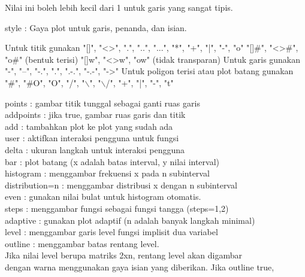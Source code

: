 \documentclass[a4paper,10pt]{article}
\begin{document}
\begin{eulernotebook}
\begin{eulercomment}
\begin{eulercomment}
\begin{eulercomment}
\begin{eulercomment}
\begin{eulercomment}
\begin{eulercomment}
\begin{eulercomment}
\end{eulercomment}
\begin{eulerttcomment}
            Nilai ini boleh lebih kecil dari 1 untuk garis yang sangat tipis.
\end{eulerttcomment}
\begin{eulercomment}
style     : Gaya plot untuk garis, penanda, dan isian.\\
\end{eulercomment}
\begin{eulerttcomment}
            Untuk titik gunakan
            "[]", "<>", ".", "..", "...",
            "*", "+", "|", "-", "o"
            "[]#", "<>#", "o#" (bentuk terisi)
            "[]w", "<>w", "ow" (tidak transparan)
            Untuk garis gunakan
            "-", "--", "-.", ".", ".-.", "-.-", "->"
            Untuk poligon terisi atau plot batang gunakan
            "#", "#O", "O", "/", "\(\backslash\)", "\(\backslash\)/",
            "+", "|", "-", "t"
\end{eulerttcomment}
\begin{eulercomment}
points    : gambar titik tunggal sebagai ganti ruas garis\\
addpoints : jika true, gambar ruas garis dan titik\\
add       : tambahkan plot ke plot yang sudah ada\\
user      : aktifkan interaksi pengguna untuk fungsi\\
delta     : ukuran langkah untuk interaksi pengguna\\
bar       : plot batang (x adalah batas interval, y nilai interval)\\
histogram : menggambar frekuensi x pada n subinterval\\
distribution=n : menggambar distribusi x dengan n subinterval\\
even      : gunakan nilai bulat untuk histogram otomatis.\\
steps     : menggambar fungsi sebagai fungsi tangga (steps=1,2)\\
adaptive  : gunakan plot adaptif (n adalah banyak langkah minimal)\\
level     : menggambar garis level fungsi implisit dua variabel\\
outline   : menggambar batas rentang level.
\\
Jika nilai level berupa matriks 2xn, rentang level akan digambar\\
dengan warna menggunakan gaya isian yang diberikan. Jika outline true,\\

\end{eulercomment}
\end{eulercomment}
\end{eulercomment}
\end{eulercomment}
\end{eulercomment}
\end{eulercomment}
\end{eulercomment}
\end{eulernotebook}
\end{document}
